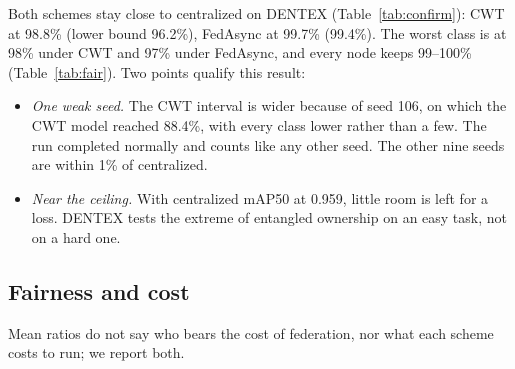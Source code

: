 \documentclass[pdflatex,sn-mathphys-num]{sn-jnl}
\begin{document}
Both schemes stay close to centralized on DENTEX (Table~\ref{tab:confirm}): CWT at 98.8\% (lower bound 96.2\%), FedAsync at 99.7\% (99.4\%). The worst class is at 98\% under CWT and 97\% under FedAsync, and every node keeps 99--100\% (Table~\ref{tab:fair}). Two points qualify this result:
\begin{itemize}
\item \emph{One weak seed.} The CWT interval is wider because of seed 106, on which the CWT model reached 88.4\%, with every class lower rather than a few. The run completed normally and counts like any other seed. The other nine seeds are within 1\% of centralized.
\item \emph{Near the ceiling.} With centralized mAP50 at 0.959, little room is left for a loss. DENTEX tests the extreme of entangled ownership on an easy task, not on a hard one.
\end{itemize}

\subsection{Fairness and cost}\label{sec:res-fair}
Mean ratios do not say who bears the cost of federation, nor what each scheme costs to run; we report both.
\end{document}
